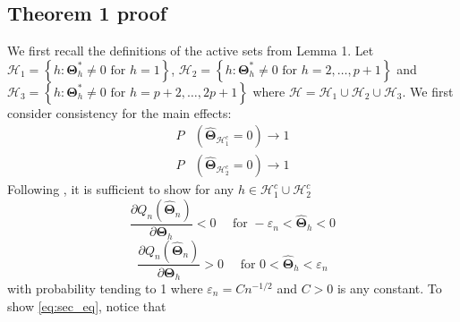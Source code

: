 \documentclass[12pt,letter]{article}\usepackage[]{graphicx}\usepackage[]{color}
\newcommand{\bTheta}{\boldsymbol{\Theta}}
\newcommand{\bThetastar}{\boldsymbol{\Theta}^{*}}
\begin{document}
\subsection{Theorem 1 proof}
We first recall the definitions of the active sets from Lemma 1. Let $\mathcal{H}_1=\left\lbrace h : \bThetastar_h \neq 0 \textrm{ for }h=1 \right\rbrace$, $\mathcal{H}_2=\left\lbrace h : \bThetastar_h \neq 0 \textrm{ for }h=2, \ldots, p+1 \right\rbrace$ and $\mathcal{H}_3=\left\lbrace h : \bThetastar_h \neq 0 \textrm{ for }h=p+2, \ldots, 2p+1 \right\rbrace$ where $\mathcal{H} = \mathcal{H}_1 \cup \mathcal{H}_2 \cup \mathcal{H}_3$. We first consider consistency for the main effects: 
\begin{align*}
P&\left(\widehat{\bTheta}_{\mathcal{H}_{1}^{c}}=0\right)\rightarrow 1 \\
P&\left(\widehat{\bTheta}_{\mathcal{H}_2^c}=0\right)\rightarrow 1
\end{align*}
Following \citep{fan2001variable,choi2010variable}, it is sufficient to show for any $h\in\mathcal{H}_{1}^{c} \cup \mathcal{H}_2^c$ 
\begin{equation}
\frac{\partial Q_{n}\left(\widehat{\boldsymbol{\Theta}}_{n}\right)}{\partial\bTheta_{h}}<0\quad\text{ for }-\varepsilon_{n}<\widehat{\bTheta}_{h}<0\label{eq:first_eq}
\end{equation}
\begin{equation}
\frac{\partial Q_{n}\left(\widehat{\boldsymbol{\Theta}}_{n}\right)}{\partial\bTheta_{h}}>0\quad\text{ for }0<\widehat{\bTheta}_{h}<\varepsilon_{n}\label{eq:sec_eq}
\end{equation}
with probability tending to 1 where $\varepsilon_{n}=Cn^{-1/2}$ and
$C>0$ is any constant. To show \eqref{eq:sec_eq}, notice that 
\end{document}
